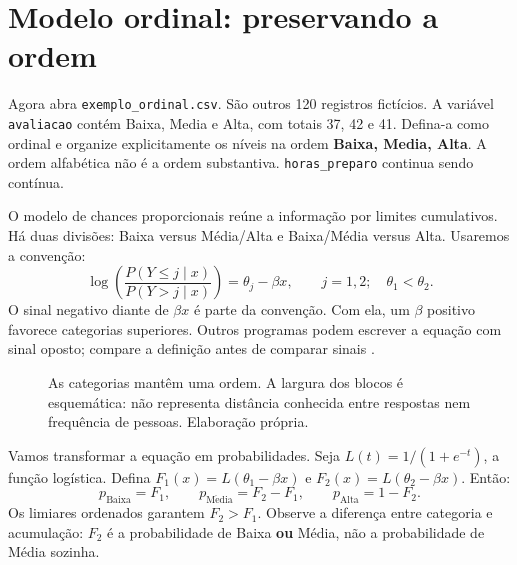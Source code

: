 \section{Modelo ordinal: preservando a ordem}

Agora abra \texttt{exemplo\_ordinal.csv}. São outros 120 registros fictícios. A variável \texttt{avaliacao} contém Baixa, Media e Alta, com totais 37, 42 e 41. Defina-a como ordinal e organize explicitamente os níveis na ordem \textbf{Baixa, Media, Alta}. A ordem alfabética não é a ordem substantiva. \texttt{horas\_preparo} continua sendo contínua.

O modelo de chances proporcionais reúne a informação por limites cumulativos. Há duas divisões: Baixa versus Média/Alta e Baixa/Média versus Alta. Usaremos a convenção:
\[
\log\left(\frac{P(Y\leq j\mid x)}{P(Y>j\mid x)}\right)=\theta_j-\beta x,
\qquad j=1,2;\quad \theta_1<\theta_2.
\]
O sinal negativo diante de $\beta x$ é parte da convenção. Com ela, um $\beta$ positivo favorece categorias superiores. Outros programas podem escrever a equação com sinal oposto; compare a definição antes de comparar sinais \parencite{RPolr}.

\begin{figure}[H]
\centering
{}
\caption{As categorias mantêm uma ordem. A largura dos blocos é esquemática: não representa distância conhecida entre respostas nem frequência de pessoas. Elaboração própria.}
\end{figure}

Vamos transformar a equação em probabilidades. Seja $L(t)=1/(1+e^{-t})$, a função logística. Defina $F_1(x)=L(\theta_1-\beta x)$ e $F_2(x)=L(\theta_2-\beta x)$. Então:
\[
p_{\mathrm{Baixa}}=F_1,\qquad
p_{\mathrm{M\acute{e}dia}}=F_2-F_1,\qquad
p_{\mathrm{Alta}}=1-F_2.
\]
Os limiares ordenados garantem $F_2>F_1$. Observe a diferença entre categoria e acumulação: $F_2$ é a probabilidade de Baixa \textbf{ou} Média, não a probabilidade de Média sozinha.

